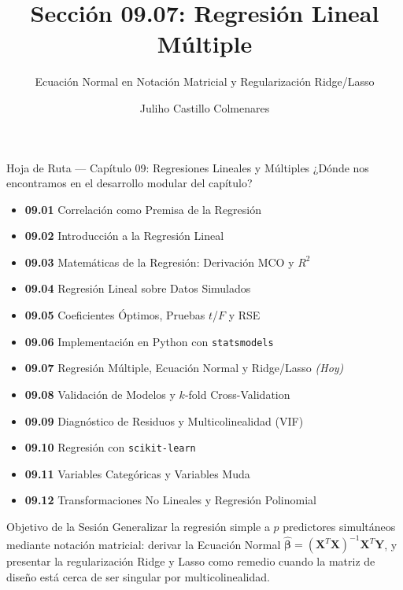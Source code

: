 \documentclass[10pt, aspectratio=169]{beamer}
\title[Regresión Múltiple]{Sección 09.07: Regresión Lineal Múltiple}
\subtitle{Ecuación Normal en Notación Matricial y Regularización Ridge/Lasso}
\author[J. Castillo Colmenares]{Juliho Castillo Colmenares}
\institute{Tecnológico de Monterrey}
\date{\vspace{-1.2cm}}
\begin{document}
\begin{frame}[plain]
  \vspace{-0.8cm}
  \titlepage
\end{frame}

\begin{frame}{Hoja de Ruta --- Capítulo 09: Regresiones Lineales y Múltiples}
  \scriptsize
  ¿Dónde nos encontramos en el desarrollo modular del capítulo?
  \begin{itemize}\itemsep=0.02em
    \item \textbf{09.01} Correlación como Premisa de la Regresión
    \item \textbf{09.02} Introducción a la Regresión Lineal
    \item \textbf{09.03} Matemáticas de la Regresión: Derivación MCO y $R^2$
    \item \textbf{09.04} Regresión Lineal sobre Datos Simulados
    \item \textbf{09.05} Coeficientes Óptimos, Pruebas $t$/$F$ y RSE
    \item \textbf{09.06} Implementación en Python con \texttt{statsmodels}
    \item \textbf{09.07} Regresión Múltiple, Ecuación Normal y Ridge/Lasso \emph{(Hoy)}
    \item \textbf{09.08} Validación de Modelos y $k$-fold Cross-Validation
    \item \textbf{09.09} Diagnóstico de Residuos y Multicolinealidad (VIF)
    \item \textbf{09.10} Regresión con \texttt{scikit-learn}
    \item \textbf{09.11} Variables Categóricas y Variables Muda
    \item \textbf{09.12} Transformaciones No Lineales y Regresión Polinomial
  \end{itemize}
  \pause
  \vspace{-0.05cm}
  \begin{block}{Objetivo de la Sesión}
    Generalizar la regresión simple a $p$ predictores simultáneos mediante notación matricial: derivar la Ecuación Normal $\hat{\boldsymbol\beta}=(\mathbf{X}^T\mathbf{X})^{-1}\mathbf{X}^T\mathbf{Y}$, y presentar la regularización Ridge y Lasso como remedio cuando la matriz de diseño está cerca de ser singular por multicolinealidad.
  \end{block}
\end{frame}
\end{document}
